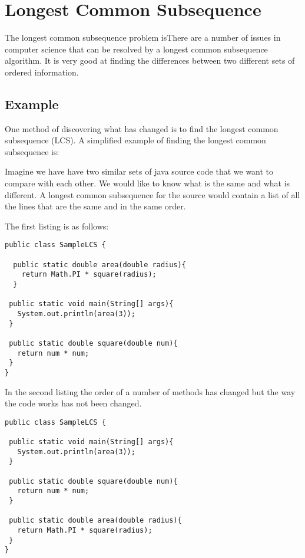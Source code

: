 \section{Longest Common Subsequence}
The longest common subsequence problem isThere are a number of issues in computer science that can be resolved by a longest common subsequence algorithm.
It is very good at finding the differences between two different sets of ordered information.


\subsection{Example}
One method of discovering what has changed is to find the longest common subsequence (LCS).
A simplified example of finding the longest common subsequence is:

Imagine we have have two similar sets of java source code that we want to compare with each other.  
We would like to know what is the same and what is different.
A longest common subsequence for the source would contain a list of all the lines that are the same and in the same order.

The first listing is as follows:

\begin{lstlisting}
public class SampleLCS { 

  public static double area(double radius){
    return Math.PI * square(radius);
  }
  
 public static void main(String[] args){
   System.out.println(area(3));
 }
 
 public static double square(double num){
   return num * num;
 }
}

\end{lstlisting}

In the second listing the order of a number of methods has changed but the way the code works has not been changed.

\begin{lstlisting}
public class SampleLCS {

 public static void main(String[] args){
   System.out.println(area(3));
 }
 
 public static double square(double num){
   return num * num;
 }
 
 public static double area(double radius){
   return Math.PI * square(radius);
 }
}

\end{lstlisting}

